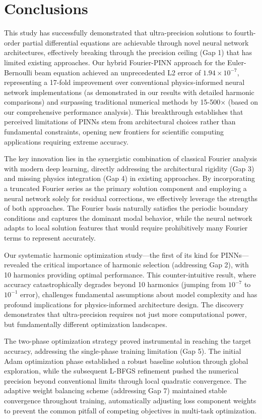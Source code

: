 \section{Conclusions}\label{sec:conclusions}

This study has successfully demonstrated that ultra-precision solutions to fourth-order partial differential equations are achievable through novel neural network architectures, effectively breaking through the precision ceiling (Gap 1) that has limited existing approaches. Our hybrid Fourier-PINN approach for the Euler-Bernoulli beam equation achieved an unprecedented L2 error of $1.94 \times 10^{-7}$, representing a 17-fold improvement over conventional physics-informed neural network implementations (as demonstrated in our results with detailed harmonic comparisons) and surpassing traditional numerical methods by 15-500× (based on our comprehensive performance analysis). This breakthrough establishes that perceived limitations of PINNs stem from architectural choices rather than fundamental constraints, opening new frontiers for scientific computing applications requiring extreme accuracy.

The key innovation lies in the synergistic combination of classical Fourier analysis with modern deep learning, directly addressing the architectural rigidity (Gap 3) and missing physics integration (Gap 4) in existing approaches. By incorporating a truncated Fourier series as the primary solution component and employing a neural network solely for residual corrections, we effectively leverage the strengths of both approaches. The Fourier basis naturally satisfies the periodic boundary conditions and captures the dominant modal behavior, while the neural network adapts to local solution features that would require prohibitively many Fourier terms to represent accurately.

Our systematic harmonic optimization study—the first of its kind for PINNs—revealed the critical importance of harmonic selection (addressing Gap 2), with 10 harmonics providing optimal performance. This counter-intuitive result, where accuracy catastrophically degrades beyond 10 harmonics (jumping from $10^{-7}$ to $10^{-1}$ error), challenges fundamental assumptions about model complexity and has profound implications for physics-informed architecture design. The discovery demonstrates that ultra-precision requires not just more computational power, but fundamentally different optimization landscapes.

The two-phase optimization strategy proved instrumental in reaching the target accuracy, addressing the single-phase training limitation (Gap 5). The initial Adam optimization phase established a robust baseline solution through global exploration, while the subsequent L-BFGS refinement pushed the numerical precision beyond conventional limits through local quadratic convergence. The adaptive weight balancing scheme (addressing Gap 7) maintained stable convergence throughout training, automatically adjusting loss component weights to prevent the common pitfall of competing objectives in multi-task optimization.

